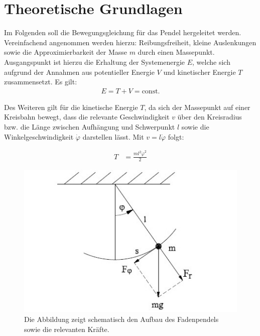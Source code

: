 \section{Theoretische Grundlagen}
\label{theorie}



Im Folgenden soll die Bewegungsgleichung für das Pendel hergeleitet werden. Vereinfachend angenommen werden hierzu: Reibungsfreiheit, kleine Auslenkungen sowie die Approximierbarkeit der Masse $m$ durch einen Massepunkt. 
Ausgangspunkt ist hierzu die Erhaltung der Systemenergie $E$, welche sich aufgrund der Annahmen aus potentieller Energie $V$ und kinetischer Energie $T$ zusammensetzt. Es gilt:
\begin{align}
E=T+V=\textrm{const.}
\label{energie}
\end{align}

Des Weiteren gilt für die kinetische Energie $T$, da sich der Massepunkt auf einer Kreisbahn bewegt, dass die relevante Geschwindigkeit $v$ über den Kreisradius bzw. die Länge zwischen Aufhängung und Schwerpunkt $l$ sowie die Winkelgeschwindigkeit $\dot{\varphi}$ darstellen lässt. Mit $v=l\dot{\varphi}$ folgt:
 
\begin{align}
T&=\frac{ml^2\dot{\varphi}^2}{2}
\label{kin}
\end{align}


\begin{figure}
	\centering
	\includegraphics{faden}
	\caption{Die Abbildung zeigt schematisch den Aufbau des Fadenpendels sowie die relevanten Kräfte.}
	\label{faden}
\end{figure}

